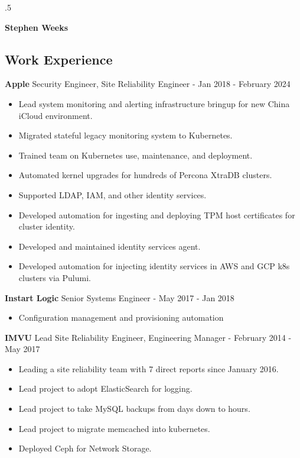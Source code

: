 \documentclass[line]{res}
\begin{document}
\moveleft.5\hoffset\centerline{\Huge\textbf{Stephen Weeks}}

\address{408.702.4448 tene@allalone.org}

\begin{resume}

\section{Work Experience}
\textbf{Apple} Security Engineer, Site Reliability Engineer - Jan 2018 - February 2024
\begin{itemize}
\item Lead system monitoring and alerting infrastructure bringup for new China iCloud environment.
\item Migrated stateful legacy monitoring system to Kubernetes.
\item Trained team on Kubernetes use, maintenance, and deployment.
\item Automated kernel upgrades for hundreds of Percona XtraDB clusters.
\item Supported LDAP, IAM, and other identity services.
\item Developed automation for ingesting and deploying TPM host certificates for cluster identity.
\item Developed and maintained identity services agent.
\item Developed automation for injecting identity services in AWS and GCP k8s clusters via Pulumi.
\end{itemize}

\textbf{Instart Logic} Senior Systems Engineer - May 2017 - Jan 2018
\begin{itemize}
\item Configuration management and provisioning automation
\end{itemize}

\textbf{IMVU} Lead Site Reliability Engineer, Engineering Manager - February 2014 - May 2017
\begin{itemize}
\item Leading a site reliability team with 7 direct reports since January 2016.
\item Lead project to adopt ElasticSearch for logging.
\item Lead project to take MySQL backups from days down to hours.
\item Lead project to migrate memcached into kubernetes.
\item Deployed Ceph for Network Storage.
\end{itemize}


\end{resume}
\end{document}
